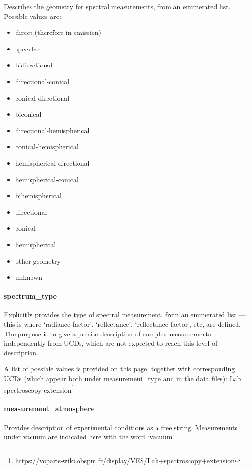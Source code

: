 \documentclass[11pt,a4paper]{ivoa}
\begin{document}
Describes the geometry for spectral measurements, from an enumerated list.
Possible values are:

\begin{itemize}
\item direct (therefore in emission)
\item specular
\item bidirectional
\item directional-conical
\item conical-directional
\item biconical
\item directional-hemispherical
\item conical-hemispherical
\item hemispherical-directional
\item hemispherical-conical
\item bihemispherical
\item directional
\item conical
\item hemispherical
\item other geometry
\item unknown
\end{itemize}

\paragraph{spectrum\_type}

Explicitly provides the type of spectral measurement, from an enumerated
list --- this is where `radiance factor', `reflectance', `reflectance
factor', etc, are defined. The purpose is to give a precise description
of complex measurements independently from UCDs, which are not expected
to reach this level of description.

A list of possible values is provided on this page,
together with corresponding UCDs (which appear both under
measurement\_type and in the data files): Lab spectroscopy
extension\footnote{\url{https://voparis-wiki.obspm.fr/display/VES/Lab+spectroscopy+extension}}

\paragraph{measurement\_atmosphere}

Provides description of experimental conditions as a free string.
Measurements under vacuum are indicated here with the word `vacuum'.
\end{document}
